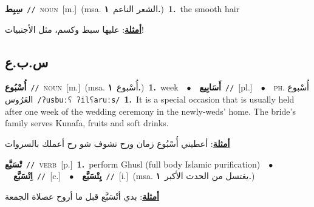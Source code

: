 \documentclass[10pt,a4paper,twoside]{article} %
\begin{document}
\begin{multicols}{2}
{\setlength\topsep{0pt}\textbf{\foreignlanguage{arabic}{سِبِط}}\ {\color{gray}\texttt{//}\color{black}}\ \textsc{noun}\ [m.]\ \color{gray}(msa. \foreignlanguage{arabic}{الشعر الناعم}~\foreignlanguage{arabic}{\textbf{١.}})\color{black}\ \textbf{1.}~the smooth hair\  \begin{flushright}\color{gray}\foreignlanguage{arabic}{\textbf{\underline{\foreignlanguage{arabic}{أمثلة}}}: عليها سبط وكسم، مثل الأجنبيات!}\end{flushright}\color{black}} \vspace{2mm}

\vspace{-3mm}
\subsection*{\color{blue}\foreignlanguage{arabic}{س.ب.ع}\color{blue}{}} 

{\setlength\topsep{0pt}\textbf{\foreignlanguage{arabic}{أُسْبُوع}}\ {\color{gray}\texttt{//}\color{black}}\ \textsc{noun}\ [m.]\ \color{gray}(msa. \foreignlanguage{arabic}{أُسْبوع}~\foreignlanguage{arabic}{\textbf{١.}})\color{black}\ \textbf{1.}~week\ \ $\bullet$\ \ \setlength\topsep{0pt}\textbf{\foreignlanguage{arabic}{أَسَابِيع}}\ {\color{gray}\texttt{//}\color{black}}\ [pl.]\ \ $\bullet$\ \ \textsc{ph.} \color{gray} \foreignlanguage{arabic}{أُسْبوع العَرُوس}\color{black}\ {\color{gray}\texttt{/{\sffamily ʔusbuːʕ ʔilʕaruːs}/}\color{black}}\ \textbf{1.}~It is a special occasion that is usually held after one week of the wedding ceremony in the newly-weds' home. The bride's family serves Kunafa, fruits and soft drinks.\  \begin{flushright}\color{gray}\foreignlanguage{arabic}{\textbf{\underline{\foreignlanguage{arabic}{أمثلة}}}: أعطيني أُسْبُوع زمان ورح تشوف شو رح أعملك بالسروات}\end{flushright}\color{black}} \vspace{2mm}

{\setlength\topsep{0pt}\textbf{\foreignlanguage{arabic}{تْسَبَّع}}\ {\color{gray}\texttt{//}\color{black}}\ \textsc{verb}\ [p.]\ \textbf{1.}~perform Ghusl (full body Islamic purification)\ \ $\bullet$\ \ \setlength\topsep{0pt}\textbf{\foreignlanguage{arabic}{اِتْسَبَّع}}\ {\color{gray}\texttt{//}\color{black}}\ [c.]\ \ $\bullet$\ \ \setlength\topsep{0pt}\textbf{\foreignlanguage{arabic}{يِتْسَبَّع}}\ {\color{gray}\texttt{//}\color{black}}\ [i.]\ \color{gray}(msa. \foreignlanguage{arabic}{يغتسل من الحدث الأكبر}~\foreignlanguage{arabic}{\textbf{١.}})\color{black}\  \begin{flushright}\color{gray}\foreignlanguage{arabic}{\textbf{\underline{\foreignlanguage{arabic}{أمثلة}}}: بدي أتْسَبَّع قبل ما أروح عصلاة الجمعة}\end{flushright}\color{black}} \vspace{2mm}


\end{multicols}
\end{document}
